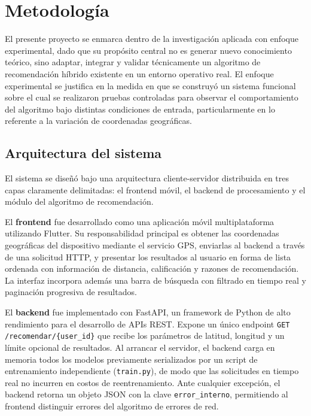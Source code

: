 \documentclass[11pt, letterpaper]{article}
\begin{document}
	\section{Metodología}
	
	El presente proyecto se enmarca dentro de la investigación aplicada con enfoque
	experimental, dado que su propósito central no es generar nuevo conocimiento
	teórico, sino adaptar, integrar y validar técnicamente un algoritmo de
	recomendación híbrido existente en un entorno operativo real. El enfoque
	experimental se justifica en la medida en que se construyó un sistema funcional
	sobre el cual se realizaron pruebas controladas para observar el comportamiento
	del algoritmo bajo distintas condiciones de entrada, particularmente en lo
	referente a la variación de coordenadas geográficas.
	
	\subsection{Arquitectura del sistema}
	
	El sistema se diseñó bajo una arquitectura cliente-servidor distribuida en tres
	capas claramente delimitadas: el frontend móvil, el backend de procesamiento y
	el módulo del algoritmo de recomendación.
	
	El \textbf{frontend} fue desarrollado como una aplicación móvil multiplataforma
	utilizando Flutter. Su responsabilidad principal es obtener las coordenadas
	geográficas del dispositivo mediante el servicio GPS, enviarlas al backend a
	través de una solicitud HTTP, y presentar los resultados al usuario en forma de
	lista ordenada con información de distancia, calificación y razones de
	recomendación. La interfaz incorpora además una barra de búsqueda con filtrado
	en tiempo real y paginación progresiva de resultados.
	
	El \textbf{backend} fue implementado con FastAPI, un framework de Python de alto
	rendimiento para el desarrollo de APIs REST. Expone un único endpoint
	\texttt{GET /recomendar/\{user\_id\}} que recibe los parámetros de latitud,
	longitud y un límite opcional de resultados. Al arrancar el servidor, el backend
	carga en memoria todos los modelos previamente serializados por un script de
	entrenamiento independiente (\texttt{train.py}), de modo que las solicitudes
	en tiempo real no incurren en costos de reentrenamiento. Ante cualquier
	excepción, el backend retorna un objeto JSON con la clave
	\texttt{error\_interno}, permitiendo al frontend distinguir errores del
	algoritmo de errores de red.
	
\end{document}
